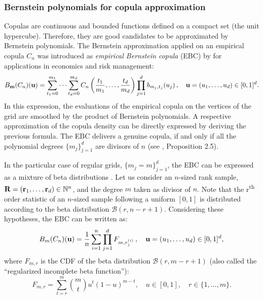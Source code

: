 \subsubsection{Bernstein polynomials for copula approximation}
Copulas are continuous and bounded functions defined on a compact set (the unit hypercube). 
Therefore, they are good candidates to be approximated by Bernstein polynomials. 
The Bernstein approximation applied on an empirical copula $C_n$ was introduced as \emph{empirical Bernstein copula} (EBC) by \cite{sancetta_satchell_2004} for applications in economics and risk management: 
\begin{equation}
    B_{{\bf m}}(C_n)({\bf u}) = \sum_{t_1=0}^{m_1} \dots \sum_{t_d=0}^{m_d} C_n\left(\frac{t_1}{m_1}, \dots, \frac{t_d}{m_d}\right) \prod_{j=1}^d b_{m_j, t_j}(u_j) \, , \quad  {\bf u} = (u_1, \dots, u_d) \in [0, 1]^d.
    \label{eq:ebc}
\end{equation}
In this expression, the evaluations of the empirical copula on the vertices of the grid are smoothed by the product of Bernstein polynomials. 
A respective approximation of the copula density can be directly expressed by deriving the previous formula. 
The EBC delivers a genuine copula, if and only if all the polynomial degrees $\{m_j\}_{j=1}^d$ are divisors of $n$ (see \citealt{segers_2017}, Proposition 2.5). 

In the particular case of regular grids, $\{m_j=m\}_{j=1}^d$, the EBC can be expressed as a mixture of beta distributions \citep{segers_2017}. 
Let us consider an $n$-sized rank sample, ${\bf R}=({\bf r}_1, \dots, {\bf r}_d) \in \mathbb{N}^{n}$, and the degree $m$ taken as divisor of $n$. 
Note that the r\textsuperscript{th} order statistic of an $n$-sized sample following a uniform $[0, 1]$ is distributed according to the beta distribution $\mathcal{B}(r, n-r+1)$. 
Considering these hypotheses, the EBC can be written as: 
\begin{equation}
    B_{m}(C_n)({\bf u}) = \frac 1n \sum_{i=1}^n \prod_{j=1}^{d} F_{m, r_j^{(i)}} \, , \quad  {\bf u} = (u_1, \dots, u_d) \in [0, 1]^d, 
\end{equation}
where $F_{m, r}$ is the CDF of the beta distribution $\mathcal{B}(r, m-r+1)$ (also called the ``regularized incomplete beta function''): 
\begin{equation}
    F_{m, r} = \sum_{t=r}^{m} \binom{m}{t}u^t(1-u)^{m-t}, \quad u \in [0, 1], \quad r \in \{1, \dots, m\}. 
\end{equation}

